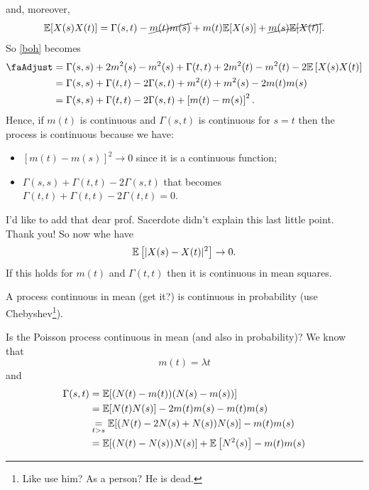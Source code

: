 \documentclass{report}
\begin{document}
\begin{enumerate}
\begin{theorem}
\begin{fancyproof}
				and, moreover,
				\begin{equation*}
					\mathbb{E}[X(s)X(t)]=\Gamma(s,t)-\cancel{m(t)m(s)}+m(t)\mathbb{E}[X(s)]+\cancel{m(s)\mathbb{E}[X(t)]}.
				\end{equation*}
				So \ref{boh} becomes
				\begin{align*}
					\text{\faAdjust}&=\Gamma(s,s)+2m^{2}(s)-m^{2}(s)+\Gamma(t,t)+2m^{2}(t)-m^{2}(t)-2\ev\left[X(s)X(t)\right]\\
					&=\Gamma(s,s)+\Gamma(t,t)-2\Gamma(s,t)+m^{2}(t)+m^{2}(s)-2m(t)m(s)\\
					&=\Gamma(s,s)+\Gamma(t,t)-2\Gamma(s,t)+\left[m(t)-m(s)\right]^{2}.
				\end{align*}
				Hence, if $m(t)$ is continuous and $\Gamma(s,t)$ is continuous for $s=t$ then the process is continuous because we have:
				\begin{itemize}
					\item $[m(t)-m(s)]^{2}\to0$ since it is a continuous function;
					\item $\Gamma(s,s)+\Gamma(t,t)-2\Gamma(s,t)$ that becomes $\Gamma(t,t)+\Gamma(t,t)-2\Gamma(t,t)=0$.
				\end{itemize}
				I'd like to add that dear prof. Sacerdote didn't explain this last little point. Thank you! So now whe have
				\begin{equation*}
					\mathbb{E}\left[|X(s)-X(t)|^{2}\right]\to0.
				\end{equation*}
				If this holds for $m(t)$ and $\Gamma(t,t)$ then it is continuous in mean squares.
			\end{fancyproof}
		\end{theorem}
		\begin{remark}
			A process continuous in mean \faSquare[regular] (get it?) is continuous in probability (use Chebyshev\footnote{Like use him? As a person? He is dead.}).
		\end{remark}
		Is the Poisson process continuous in mean \faSquare[regular] (and also in probability)? We know that
		\begin{equation*}
			m(t)=\lambda t
		\end{equation*}
		and 
		\begin{align*}
			\Gamma(s,t)&=\ev[(N(t)-m(t))(N(s)-m(s))]\\
			&=\ev[N(t)N(s)]-2m(t)m(s)-m(t)m(s)\\
			&\underset{t>s}{=}\ev[(N(t)-2N(s)+N(s))N(s)]-m(t)m(s)\\
			&=\ev[(N(t)-N(s))N(s)]+\ev\left[N^{2}(s)\right]-m(t)m(s)\\

\end{align*}
\end{enumerate}
\end{document}
